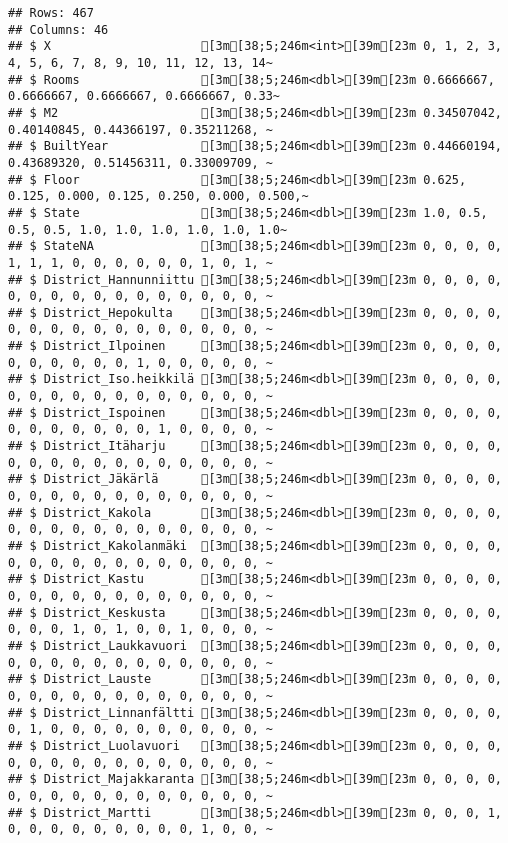 \documentclass[
]{article}
\begin{document}
\begin{verbatim}
## Rows: 467
## Columns: 46
## $ X                     [3m[38;5;246m<int>[39m[23m 0, 1, 2, 3, 4, 5, 6, 7, 8, 9, 10, 11, 12, 13, 14~
## $ Rooms                 [3m[38;5;246m<dbl>[39m[23m 0.6666667, 0.6666667, 0.6666667, 0.6666667, 0.33~
## $ M2                    [3m[38;5;246m<dbl>[39m[23m 0.34507042, 0.40140845, 0.44366197, 0.35211268, ~
## $ BuiltYear             [3m[38;5;246m<dbl>[39m[23m 0.44660194, 0.43689320, 0.51456311, 0.33009709, ~
## $ Floor                 [3m[38;5;246m<dbl>[39m[23m 0.625, 0.125, 0.000, 0.125, 0.250, 0.000, 0.500,~
## $ State                 [3m[38;5;246m<dbl>[39m[23m 1.0, 0.5, 0.5, 0.5, 1.0, 1.0, 1.0, 1.0, 1.0, 1.0~
## $ StateNA               [3m[38;5;246m<dbl>[39m[23m 0, 0, 0, 0, 1, 1, 1, 0, 0, 0, 0, 0, 0, 1, 0, 1, ~
## $ District_Hannunniittu [3m[38;5;246m<dbl>[39m[23m 0, 0, 0, 0, 0, 0, 0, 0, 0, 0, 0, 0, 0, 0, 0, 0, ~
## $ District_Hepokulta    [3m[38;5;246m<dbl>[39m[23m 0, 0, 0, 0, 0, 0, 0, 0, 0, 0, 0, 0, 0, 0, 0, 0, ~
## $ District_Ilpoinen     [3m[38;5;246m<dbl>[39m[23m 0, 0, 0, 0, 0, 0, 0, 0, 0, 0, 1, 0, 0, 0, 0, 0, ~
## $ District_Iso.heikkilä [3m[38;5;246m<dbl>[39m[23m 0, 0, 0, 0, 0, 0, 0, 0, 0, 0, 0, 0, 0, 0, 0, 0, ~
## $ District_Ispoinen     [3m[38;5;246m<dbl>[39m[23m 0, 0, 0, 0, 0, 0, 0, 0, 0, 0, 0, 1, 0, 0, 0, 0, ~
## $ District_Itäharju     [3m[38;5;246m<dbl>[39m[23m 0, 0, 0, 0, 0, 0, 0, 0, 0, 0, 0, 0, 0, 0, 0, 0, ~
## $ District_Jäkärlä      [3m[38;5;246m<dbl>[39m[23m 0, 0, 0, 0, 0, 0, 0, 0, 0, 0, 0, 0, 0, 0, 0, 0, ~
## $ District_Kakola       [3m[38;5;246m<dbl>[39m[23m 0, 0, 0, 0, 0, 0, 0, 0, 0, 0, 0, 0, 0, 0, 0, 0, ~
## $ District_Kakolanmäki  [3m[38;5;246m<dbl>[39m[23m 0, 0, 0, 0, 0, 0, 0, 0, 0, 0, 0, 0, 0, 0, 0, 0, ~
## $ District_Kastu        [3m[38;5;246m<dbl>[39m[23m 0, 0, 0, 0, 0, 0, 0, 0, 0, 0, 0, 0, 0, 0, 0, 0, ~
## $ District_Keskusta     [3m[38;5;246m<dbl>[39m[23m 0, 0, 0, 0, 0, 0, 0, 1, 0, 1, 0, 0, 1, 0, 0, 0, ~
## $ District_Laukkavuori  [3m[38;5;246m<dbl>[39m[23m 0, 0, 0, 0, 0, 0, 0, 0, 0, 0, 0, 0, 0, 0, 0, 0, ~
## $ District_Lauste       [3m[38;5;246m<dbl>[39m[23m 0, 0, 0, 0, 0, 0, 0, 0, 0, 0, 0, 0, 0, 0, 0, 0, ~
## $ District_Linnanfältti [3m[38;5;246m<dbl>[39m[23m 0, 0, 0, 0, 0, 1, 0, 0, 0, 0, 0, 0, 0, 0, 0, 0, ~
## $ District_Luolavuori   [3m[38;5;246m<dbl>[39m[23m 0, 0, 0, 0, 0, 0, 0, 0, 0, 0, 0, 0, 0, 0, 0, 0, ~
## $ District_Majakkaranta [3m[38;5;246m<dbl>[39m[23m 0, 0, 0, 0, 0, 0, 0, 0, 0, 0, 0, 0, 0, 0, 0, 0, ~
## $ District_Martti       [3m[38;5;246m<dbl>[39m[23m 0, 0, 0, 1, 0, 0, 0, 0, 0, 0, 0, 0, 0, 1, 0, 0, ~

\end{verbatim}
\end{document}
